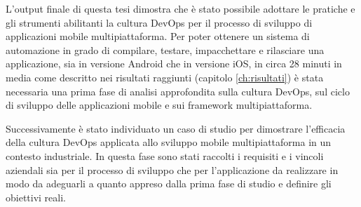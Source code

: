 
L'output finale di questa tesi dimostra che è stato possibile adottare le pratiche e gli strumenti abilitanti la cultura DevOps per il processo di sviluppo di applicazioni mobile multipiattaforma. Per poter ottenere un sistema di automazione in grado di compilare, testare, impacchettare e rilasciare una applicazione, sia in versione Android che in versione iOS, in circa 28 minuti in media come descritto nei risultati raggiunti (capitolo \ref{ch:risultati}) è stata necessaria una prima fase di analisi approfondita sulla cultura DevOps, sul ciclo di sviluppo delle applicazioni mobile e sui framework multipiattaforma. 

Successivamente è stato individuato un caso di studio per dimostrare l'efficacia della cultura DevOps applicata allo sviluppo mobile multipiattaforma in un contesto industriale. In questa fase sono stati raccolti i requisiti e i vincoli aziendali sia per il processo di sviluppo che per l'applicazione da realizzare in modo da adeguarli a quanto appreso dalla prima fase di studio e definire gli obiettivi reali.




